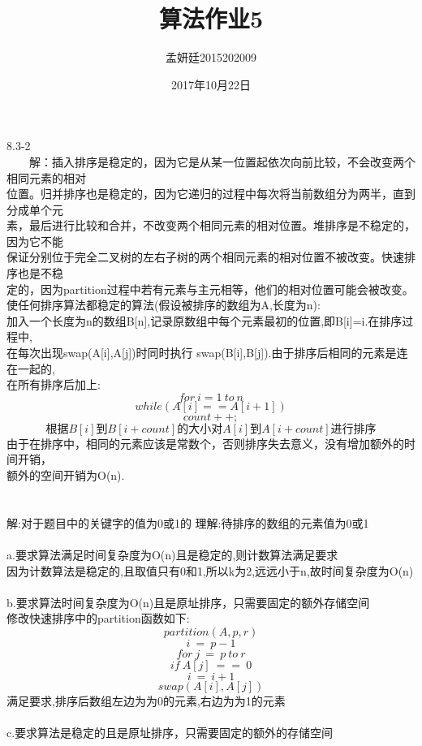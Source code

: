 \documentclass[19pt,a4paper]{article}
\title{算法作业5}
\author{孟妍廷2015202009}
\date{2017年10月22日}
\begin{document}
\maketitle

8.3-2\\
\indent \ \ \ \ 解：插入排序是稳定的，因为它是从某一位置起依次向前比较，不会改变两个相同元素的相对\\
\indent 位置。归并排序也是稳定的，因为它递归的过程中每次将当前数组分为两半，直到分成单个元\\
\indent 素，最后进行比较和合并，不改变两个相同元素的相对位置。堆排序是不稳定的，因为它不能\\
\indent 保证分别位于完全二叉树的左右子树的两个相同元素的相对位置不被改变。快速排序也是不稳\\
\indent 定的，因为partition过程中若有元素与主元相等，他们的相对位置可能会被改变。\\
\indent 使任何排序算法都稳定的算法(假设被排序的数组为A,长度为n): \\
\indent 加入一个长度为n的数组B[n],记录原数组中每个元素最初的位置,即B[i]=i.在排序过程中,\\
\indent 在每次出现swap(A[i],A[j])时同时执行 swap(B[i],B[j]).由于排序后相同的元素是连在一起的,\\
\indent 在所有排序后加上:
$$for \ i=1\ to\ n$$
$$while(A[i]==A[i+1])$$
$$count++;$$
$$根据B[i]到B[i+count]的大小对A[i]到A[i+count]进行排序$$
\indent 由于在排序中，相同的元素应该是常数个，否则排序失去意义，没有增加额外的时间开销，\\
\indent 额外的空间开销为O(n).
\\
\\
\\
\indent 解:对于题目中的关键字的值为0或1的 理解:待排序的数组的元素值为0或1\\
\\
\indent a.要求算法满足时间复杂度为O(n)且是稳定的,则计数算法满足要求\\
\indent 因为计数算法是稳定的,且取值只有0和1,所以k为2,远远小于n,故时间复杂度为O(n)\\
\\
\indent b.要求算法时间复杂度为O(n)且是原址排序，只需要固定的额外存储空间\\
\indent 修改快速排序中的partition函数如下:
$$partition(A,p,r)$$
$$i\ = \ p-1$$
$$for\ j\ =\ p\ to\ r$$
$$if\ A[j]\ ==\ 0$$
$$i\ =\ i+1$$
$$swap(A[i],A[j])$$
\indent 满足要求,排序后数组左边为为0的元素,右边为为1的元素\\
\\
\indent c.要求算法是稳定的且是原址排序，只需要固定的额外的存储空间\\
\end{document}
